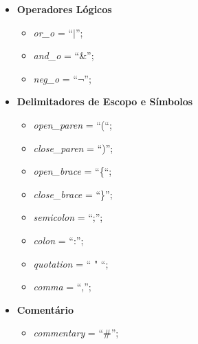 \documentclass[12pt, a4paper]{IEEEtran}
\begin{document}
\begin{itemize}
\item \textbf{Operadores Lógicos}
  \begin{itemize}
  \item \emph{or\_o} = ``$|$'';
  \item \emph{and\_o} = ``\&'';
  \item \emph{neg\_o} = ``$\lnot$'';
  \end{itemize}
\end{itemize}

\begin{itemize}
\item \textbf{Delimitadores de Escopo e Símbolos}
  \begin{itemize}
  \item \emph{open\_paren} = ``(``;
  \item \emph{close\_paren} = ``)'';
  \item \emph{open\_brace} = ``\{``;
  \item \emph{close\_brace} = ``\}'';
  \item \emph{semicolon} = ``;'';
  \item \emph{colon} = ``:'';
  \item \emph{quotation} = `` " ``;
  \item \emph{comma} = ``,'';
  \end{itemize}
\end{itemize}

\begin{itemize}
\item \textbf{Comentário}
  \begin{itemize}
  \item \emph{commentary} = ``\#'';
  \end{itemize}
\end{itemize}
\end{document}
